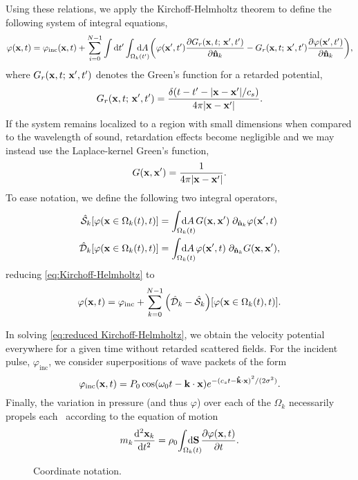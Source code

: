 Using these relations, we apply the Kirchoff-Helmholtz theorem to define the following system of integral equations,
\begin{equation}
  \varphi(\vb{x}, t) = \varphi_\text{inc}(\vb{x}, t) + \sum_{i = 0}^{N - 1}
  \int \dd{t'} \int_{\Omega_k(t')} \mkern-30mu \dd{A}
\qty(
\varphi(\vb{x}',t') \pdv{\ensuremath{G_r(\vb{x}, t; \, \vb{x}', t')}}{\vu{n}_k} - G_r(\vb{x}, t; \, \vb{x}', t') \pdv{\varphi(\vb{x}',t')}{\vu{n}_k}),
  \label{eq:Kirchoff-Helmholtz}
\end{equation}
where $G_r(\vb{x}, t; \, \vb{x}', t')$ denotes the Green's function for a retarded potential, 
\begin{equation}
  G_r(\vb{x}, t; \, \vb{x}', t') = \frac{\delta\qty(t - t' - \abs{\vb{x}-\vb{x}'}/c_s)}{4\pi \abs{\vb{x}-\vb{x}'}}.
  \label{eq:retarded green's function}
\end{equation}
If the system remains localized to a region with small dimensions when compared to the wavelength of sound, retardation effects become negligible and we may instead use the Laplace-kernel Green's function,
\begin{equation}
  G\qty(\vb{x}, \vb{x}') = \frac{1}{4\pi\abs{\vb{x} - \vb{x}'}}.
  \label{eq:green's function}
\end{equation}
To ease notation, we define the following two integral operators,
\begin{subequations}
\begin{align}
  \hat{\mathcal{S}}_k\qty[\varphi(\vb{x} \in \Omega_k(t), t)] &= \int_{\Omega_k(t)} \mkern-30mu \dd{A} G(\vb{x}, \vb{x}') \; \partial_{\vu{n}_k} \varphi(\vb{x}',t) 
  \label{eq:single layer}\\
  \hat{\mathcal{D}}_k\qty[\varphi(\vb{x} \in \Omega_k(t), t)] &= \int_{\Omega_k(t)} \mkern-30mu \dd{A} \varphi(\vb{x}',t) \; \partial_{\vu{n}_k} G(\vb{x}, \vb{x}'), \label{eq:double layer}
\end{align}
  \label{eq:operator_kirchoff}
\end{subequations}
reducing \cref{eq:Kirchoff-Helmholtz} to
\begin{equation}
  \varphi(\vb{x},t) = \varphi_\text{inc} + \sum_{k = 0}^{N - 1} \qty(\hat{\mathcal{D}}_k - \hat{\mathcal{S}}_k)\qty[\varphi(\vb{x} \in \Omega_k(t), t)].
  \label{eq:reduced Kirchoff-Helmholtz}
\end{equation}

In solving \cref{eq:reduced Kirchoff-Helmholtz}, we obtain the velocity potential everywhere for a given time without retarded scattered fields.
For the incident pulse, $\varphi_\text{inc}$, we consider superpositions of wave packets of the form
\begin{equation}
  \varphi_\text{inc}(\vb{x}, t) = P_0\cos(\omega_0 t - \vb{k}\cdot\vb{x})e^{-{(c_s t - \vu{k}\cdot\vb{x})}^2/(2 \sigma^2)}.
  \label{eq:inc_field}
\end{equation}
Finally, the variation in pressure (and thus $\varphi$) over each of the $\Omega_k$ necessarily propels each \bubble\ according to the equation of motion
\begin{equation}
  m_k \dv[2]{\vb{x}_k}{t} = \rho_0 \! \int_{\Omega_k(t)} \mkern-30mu \dd{\vb{S}} \pdv{\varphi\qty(\vb{x}, t)}{t}.
  \label{eq:Newton}
\end{equation}

\begin{figure}[t]
  \centering
  
  \caption{\label{fig:diagram}Coordinate notation.}
\end{figure}
